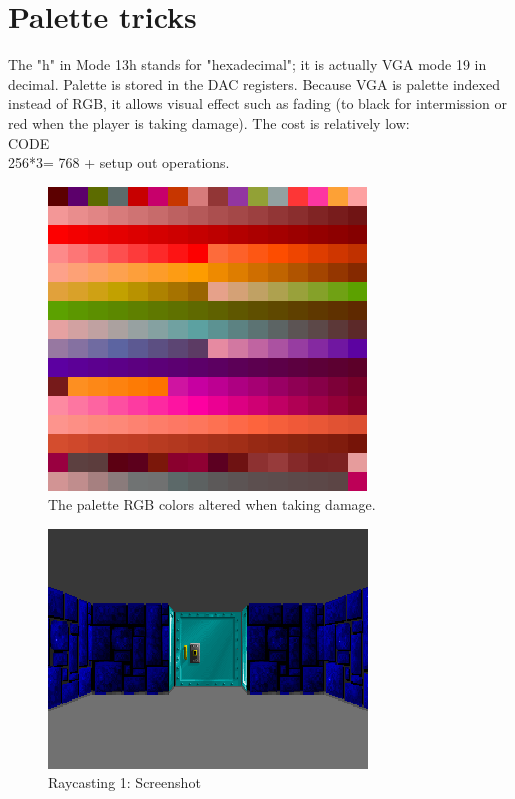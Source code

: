 






\section{Palette tricks}
The "h" in Mode 13h stands for "hexadecimal"; it is actually VGA mode 19 in decimal.
Palette is stored in the DAC registers.
Because VGA is palette indexed instead of RGB, it allows visual effect such as fading (to black for intermission or red when the player is taking damage). The cost is relatively low:\\
CODE\\
256*3= 768 + setup out operations.
\begin{figure}[H]
  \centering
 \includegraphics[scale=1.3]{imgs/palette_damage.png}
 \caption{The palette RGB colors altered when taking damage.} \label{fig:palette_damage}
\end{figure}



\begin{figure}[H]
  \centering
 \includegraphics[scale=1.3]{imgs/ray_caster_explained/beginning.png}
 \caption{Raycasting 1: Screenshot} \label{fig:Raycasting2Drawing}
\end{figure}

